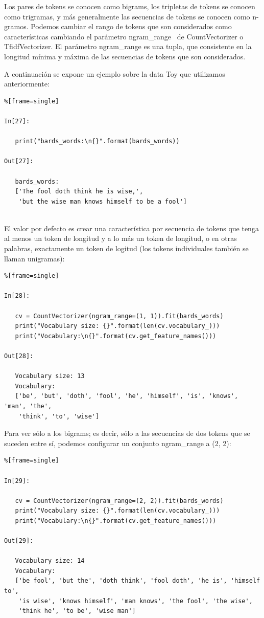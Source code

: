 Los pares de tokens  se conocen como bigrams, los tripletas de tokens se conocen como trigramas, y más generalmente las secuencias de tokens se conocen como n-gramos.
Podemos cambiar el rango de tokens que son  considerados como características cambiando el parámetro {\ttfamily ngram\_range} \, de {\ttfamily CountVectorizer} o  {\ttfamily TfidfVectorizer}. 
El parámetro {\ttfamily  ngram\_range} es una tupla, que consistente en la longitud mínima y máxima de las secuencias de  tokens que son considerados. 

A continuación se expone  un ejemplo  sobre la data Toy  que utilizamos anteriormente:

\begin{lstlisting}%[frame=single]

In[27]:

   print("bards_words:\n{}".format(bards_words))

Out[27]:

   bards_words:
   ['The fool doth think he is wise,',
    'but the wise man knows himself to be a fool']
    
\end{lstlisting}

El valor por defecto  es crear una característica por secuencia de tokens que tenga al menos un token de  longitud  y a lo más un token de longitud, o en otras palabras, exactamente un token de logitud (los tokens individuales también se llaman unigramas):

\begin{lstlisting}%[frame=single]

In[28]:

   cv = CountVectorizer(ngram_range=(1, 1)).fit(bards_words)
   print("Vocabulary size: {}".format(len(cv.vocabulary_)))
   print("Vocabulary:\n{}".format(cv.get_feature_names()))

Out[28]:

   Vocabulary size: 13
   Vocabulary:
   ['be', 'but', 'doth', 'fool', 'he', 'himself', 'is', 'knows', 'man', 'the',
    'think', 'to', 'wise']

\end{lstlisting}

Para ver sólo a los bigrams; es decir, sólo a las secuencias de dos tokens que se suceden 
entre sí, podemos configurar un conjunto {\ttfamily ngram\_range} a (2, 2):

\begin{lstlisting}%[frame=single]

In[29]:

   cv = CountVectorizer(ngram_range=(2, 2)).fit(bards_words)
   print("Vocabulary size: {}".format(len(cv.vocabulary_)))
   print("Vocabulary:\n{}".format(cv.get_feature_names()))

Out[29]:
  
   Vocabulary size: 14
   Vocabulary:
   ['be fool', 'but the', 'doth think', 'fool doth', 'he is', 'himself to',
    'is wise', 'knows himself', 'man knows', 'the fool', 'the wise',
    'think he', 'to be', 'wise man']

\end{lstlisting}


